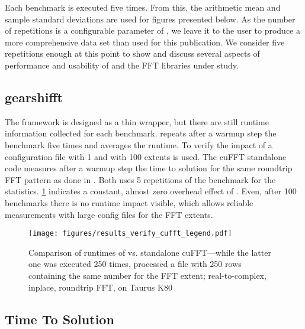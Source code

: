 Each benchmark is executed five times. From this, the arithmetic mean and sample standard deviations are used for figures presented below. As the number of repetitions is a configurable parameter of \gearshifft{}, we leave it to the user to produce a more comprehensive data set than used for this publication. We consider five repetitions enough at this point to show and discuss several aspects of performance and usability of \gearshifft{} and the FFT libraries under study.  


\subsection{gearshifft}
The \gearshifft{} framework is designed as a thin wrapper, but there are still runtime information collected for each benchmark. 
\gearshifft{} repeats after a warmup step the benchmark five times and averages the runtime. To verify the impact of \gearshifft{} a configuration file with 1 and with 100 extents is used.
The cuFFT standalone code measures after a warmup step the time to solution for the same roundtrip FFT pattern as done in \gearshifft{}.
Both uses 5 repetitions of the benchmark for the statistics.
\cref{fig:verify_cufft} indicates a constant, almost zero overhead effect of \gearshifft{}.
Even, after 100 benchmarks there is no runtime impact visible, which allows reliable measurements with large config files for the FFT extents.

\begin{figure}[!htbp]
  \centering
  \texttt{[image: figures/results\_verify\_cufft\_legend.pdf]}\vspace{-1em}
  \hfill
  \caption{Comparison of runtimes of \gearshifft{} vs. standalone cuFFT---while the latter one was executed 250 times, \gearshifft{} processed a file with 250 rows containing the same number for the FFT extent; real-to-complex, inplace, roundtrip FFT, on Taurus K80 \cite{taurus}}
  \label{fig:verify_cufft}
\end{figure}



\subsection{Time To Solution}
\label{ssec:tts}

